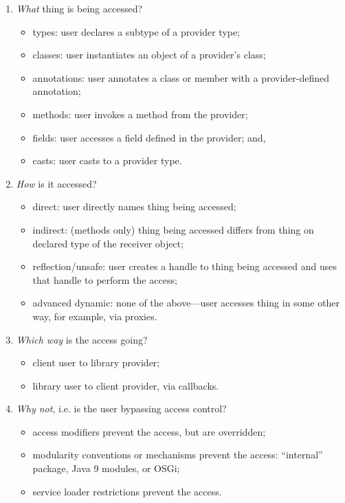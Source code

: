 \begin{enumerate}
\item \emph{What} thing is being accessed?
\begin{itemize}
    \item types: user declares a subtype of a provider type;
    \item classes: user instantiates an object of a provider's class;
    \item annotations: user annotates a class or member with a provider-defined annotation;
    \item methods: user invokes a method from the provider;
    \item fields: user accesses a field defined in the provider; and,
     \item casts: user casts to a provider type.
\end{itemize}
\item \emph{How} is it accessed?
\begin{itemize}
    \item direct: user directly names thing being accessed;
    \item indirect: (methods only) thing being accessed differs from thing on declared type of the receiver object;
    \item reflection/unsafe: user creates a handle to thing being accessed and uses that handle to perform the access;
    \item advanced dynamic: none of the above---user accesses thing in some other way, for example, via proxies.%
\end{itemize}
\item \emph{Which way} is the access going?
\begin{itemize}
    \item client user to library provider;
    \item library user to client provider, via callbacks.
\end{itemize}
\item \emph{Why not}, i.e. is the user bypassing access control?
\begin{itemize}
    \item access modifiers prevent the access, but are overridden;
    \item modularity conventions or mechanisms prevent the access: ``internal'' package, Java 9 modules, or OSGi;
    \item service loader restrictions prevent the access.
\end{itemize}
\end{enumerate}


